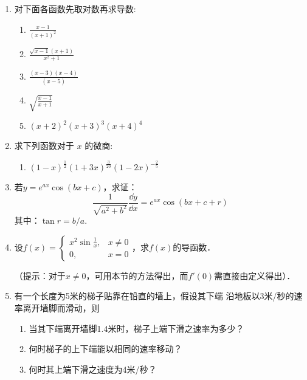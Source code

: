 \begin{ex}
\begin{enumerate}
 \item    对下面各函数先取对数再求导数:
 \begin{multicols}{2}
    \begin{enumerate}
        \item   $\frac{x-1}{(x+1)^{2}}$
        \item   $\frac{\sqrt{x-1}(x+1)}{x^{2}+1}$
        \item   $\frac{(x-3)(x-4)}{(x-5)}$
        \item   $\sqrt{\frac{x-1}{x+1}}$ 
        \item  $(x+2)^{2}(x+3)^{3}(x+4)^{4}$
\end{enumerate}
\end{multicols}
\item  求下列函数对于 $x$ 的微商:
\begin{enumerate}
\item $(1-x)^{\tfrac{1}{2}}(1+3x)^{\tfrac{3}{20}}(1-2x)^{-\tfrac{2}{5}}$
\end{enumerate}

\item 若$y=e^{ax}\cos(bx+c)$，求证：
\[\frac{1}{\sqrt{a^2+b^2}}\frac{\dd y}{\dd x}=e^{ax}\cos(bx+c+r)\]
其中：$\tan r=b/a$.

\item 设$f(x)=\begin{cases}
    x^2\sin\frac{1}{x},& x\ne 0\\
    0,& x=0
\end{cases}$，求$f(x)$的导函数．

（提示：对于$x\ne 0$，可用本节的方法得出，而$f'(0)$需直接由定义得出）．

\item 有一个长度为5米的梯子贴靠在铅直的墙上，假设其下端
沿地板以3米/秒的速率离开墙脚而滑动，则
\begin{enumerate}
    \item 当其下端离开墙脚1.4米时，梯子上端下滑之速率为多少？
    \item 何时梯子的上下端能以相同的速率移动？
    \item 何时其上端下滑之速度为4米/秒？
\end{enumerate}


\end{enumerate}
\end{ex}
